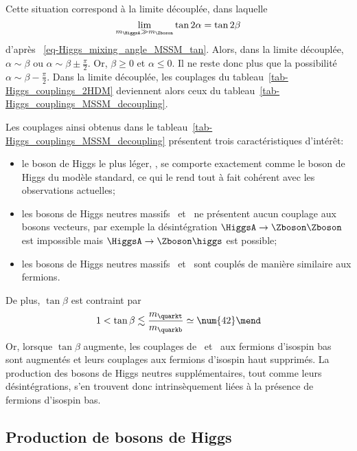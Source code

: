 Cette situation correspond à la limite découplée, dans laquelle
\begin{equation}
\lim_{m_{\HiggsA}\gg m_{\Zboson}} \tan 2\alpha = \tan 2\beta
\end{equation}
d'après ~\eqref{eq-Higgs_mixing_angle_MSSM_tan}.
Alors, dans la limite découplée, $\alpha \sim \beta$ ou $\alpha\sim\beta\pm\frac{\pi}{2}$.
Or, $\beta\geq0$ et $\alpha\leq0$.
Il ne reste donc plus que la possibilité $\alpha\sim\beta-\frac{\pi}{2}$.
Dans la limite découplée, les couplages du tableau~\ref{tab-Higgs_couplings_2HDM} deviennent alors ceux du tableau~\ref{tab-Higgs_couplings_MSSM_decoupling}.
\par Les couplages ainsi obtenus dans le tableau~\ref{tab-Higgs_couplings_MSSM_decoupling} présentent trois caractéristiques d'intérêt:
\begin{itemize}
\item le boson de Higgs le plus léger, \higgs, se comporte exactement comme le boson de Higgs du modèle standard, ce qui le rend tout à fait cohérent avec les observations actuelles;
\item les bosons de Higgs neutres massifs \Higgs\ et \HiggsA\ ne présentent aucun couplage aux bosons vecteurs, par exemple la désintégration $\HiggsA\to\Zboson\Zboson$ est impossible mais $\HiggsA\to\Zboson\higgs$ est possible;
\item les bosons de Higgs neutres massifs \Higgs\ et \HiggsA\ sont couplés de manière similaire aux fermions.
\end{itemize}
\par De plus, $\tan\beta$ est contraint par~\cite{Ridolfi-SUSY}
\begin{equation}
1 < \tan\beta \lesssim \frac{m_{\quarkt}}{m_{\quarkb}} \simeq \num{42} \mend
\end{equation}
Or, lorsque $\tan\beta$ augmente, les couplages de \Higgs\ et \HiggsA\ aux fermions d'isospin bas sont augmentés et leurs couplages aux fermions d'isospin haut supprimés.
La production des bosons de Higgs neutres supplémentaires, tout comme leurs désintégrations, s'en trouvent donc intrinsèquement liées à la présence de fermions d'isospin bas.
\subsection{Production de bosons de Higgs}\label{chapter-MS-MSSM-section-pheno_Higgs_MSSM-subsec-production}
